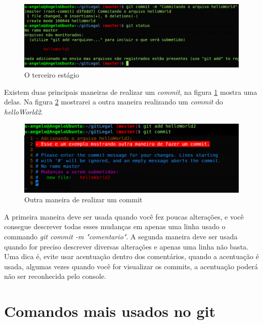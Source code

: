 \documentclass[12pt,openright,oneside,a4paper,english,brazil]{abntex2}
\begin{document}
\begin{figure}[h]
	\caption{\label{estagio3}O terceiro estágio}
	\begin{center}
		\includegraphics[width=1\linewidth]{estagio3}
	\end{center}
\end{figure}

Existem duas principais maneiras de realizar um \textit{commit}, na figura \ref{estagio3} mostra uma delas. Na figura \ref{commit} mostrarei a outra maneira realizando um \textit{commit} do \textit{helloWorld2}. 

\begin{figure}[h]
	\caption{\label{commit}Outra maneira de realizar um commit}
	\begin{center}
		\includegraphics[width=1\linewidth]{commit2}
	\end{center}
\end{figure}

A primeira maneira deve ser usada quando você fez poucas alterações, e você consegue descrever todas esses mudanças em apenas uma linha usado o commando \textit{git commit -m "comentario"}. A segunda maneira deve ser usada quando for preciso descrever diversas alterações e apenas uma linha não basta. Uma dica é, evite usar acentuação dentro dos comentários, quando a acentuação é usada, algumas vezes quando você for visualizar os commits, a acentuação poderá não ser reconhecida pelo console.

\chapter{Comandos mais usados no git}
\end{document}
